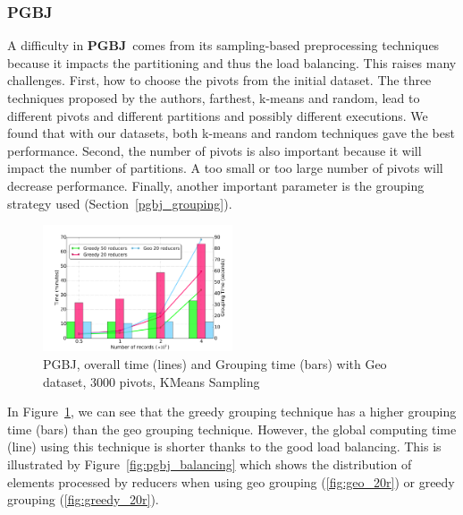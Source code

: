 \documentclass[10pt,journal,compsoc]{IEEEtran}
\newcommand{\VO}{{\bf PGBJ}}
\begin{document}
\subsubsection{PGBJ} 
A difficulty in \VO~comes from its sampling-based preprocessing techniques because it 
impacts the partitioning and thus the load balancing. This raises many challenges. First, how to choose
the pivots from the initial dataset. The three techniques proposed by the authors, farthest, k-means and 
random, lead to different pivots and different partitions and possibly different executions. We found that 
with  our datasets, both k-means and random techniques
gave the best performance. Second, the number of pivots is also important because
it will impact the number of partitions. A too small or too large number of pivots 
will decrease performance. Finally, another important parameter is the grouping strategy used 
(Section~\ref{pgbj_grouping}).
\begin{figure}[!h]
   \includegraphics[width=0.5\textwidth]{strategy.pdf} 
   \caption{PGBJ, overall time (lines) and Grouping time (bars)\label{fig:pgbj_strategy} with Geo dataset, 3000 pivots, 
   KMeans Sampling}         
\end{figure}
In Figure~\ref{fig:pgbj_strategy}, we can see that the greedy grouping technique has a higher grouping time 
(bars) than the geo grouping technique. 
However, the global computing time (line) using this technique is shorter thanks to the good load balancing. This
is illustrated by Figure~\ref{fig:pgbj_balancing} which shows the distribution of elements processed
by reducers when using geo grouping (\ref{fig:geo_20r}) or greedy grouping (\ref{fig:greedy_20r}).
                  
\end{document}
